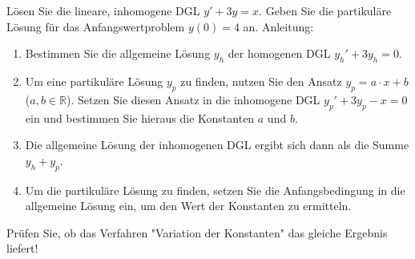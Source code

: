 \item
Lösen Sie die lineare, inhomogene DGL $y'+3y = x$. Geben Sie die partikuläre Lösung für das Anfangswertproblem $y(0)=4$ an. Anleitung:
\begin{enumerate}
\item Bestimmen Sie die allgemeine Lösung $y_h$ der homogenen DGL $y_h'+3y_h=0$.
\item Um eine partikuläre Lösung $y_p$ zu finden, nutzen Sie den Ansatz $y_p = a\cdot x +b$ ($a,b\in\mathbb{R}$). Setzen Sie diesen Ansatz in die inhomogene DGL $y_p'+3y_p-x=0$ ein und bestimmen Sie hieraus die Konstanten $a$ und $b$.
\item Die allgemeine Lösung der inhomogenen DGL ergibt sich dann als die Summe $y_h+y_p$.
\item Um die partikuläre Lösung zu finden, setzen Sie die Anfangsbedingung in die allgemeine Lösung ein, um den Wert der Konstanten zu ermitteln.
\end{enumerate}

Prüfen Sie, ob das Verfahren "Variation der Konstanten" das gleiche Ergebnis liefert!
